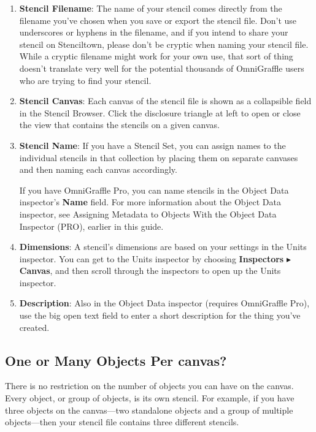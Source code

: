 \documentclass[../main.tex]{subfiles}
\begin{document}
\begin{enumerate}
\item \textbf{Stencil Filename}: The name of your stencil comes directly from the filename
  you've chosen when you save or export the stencil file. Don't use underscores or hyphens in
  the filename, and if you intend to share your stencil on Stenciltown, please don't be
  cryptic when naming your stencil file. While a cryptic filename might work for your own use,
  that sort of thing doesn't translate very well for the potential thousands of OmniGraffle
  users who are trying to find your stencil.
\item \textbf{Stencil Canvas}: Each canvas of the stencil file is shown as a collapsible field
  in the Stencil Browser. Click the disclosure triangle at left to open or close the view that
  contains the stencils on a given canvas.
\item \textbf{Stencil Name}: If you have a Stencil Set, you can assign names to the individual
  stencils in that collection by placing them on separate canvases and then naming each canvas
  accordingly.

  If you have OmniGraffle Pro, you can name stencils in the Object Data inspector's
  \textbf{Name} field. For more information about the Object Data inspector, see Assigning
  Metadata to Objects With the Object Data Inspector (PRO), earlier in this guide.
\item \textbf{Dimensions}: A stencil's dimensions are based on your settings in the Units
  inspector. You can get to the Units inspector by choosing \textbf{Inspectors}
  $\blacktriangleright$ \textbf{Canvas}, and then scroll through the inspectors to open up the
  Units inspector.
\item \textbf{Description}: Also in the Object Data inspector (requires OmniGraffle Pro), use
  the big open text field to enter a short description for the thing you've created.
\end{enumerate}

\subsection{One or Many Objects Per canvas?}

There is no restriction on the number of objects you can have on the canvas. Every object, or
group of objects, is its own stencil. For example, if you have three objects on the
canvas---two standalone objects and a group of multiple objects---then your stencil file
contains three different stencils.
\end{document}
